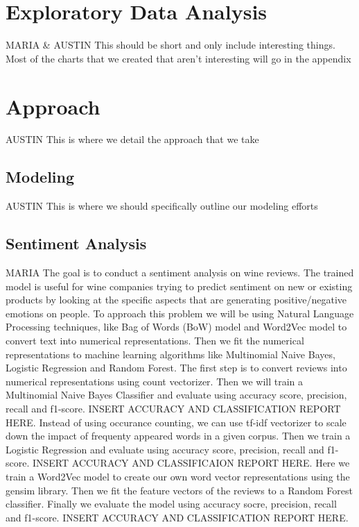 \documentclass[11pt,english]{article}
\begin{document}
\section{Exploratory Data Analysis}
    MARIA \& AUSTIN
    This should be short and only include interesting things. Most of the charts that we created that aren't interesting will go in the appendix

\section{Approach}
    AUSTIN
    This is where we detail the approach that we take

\subsection{Modeling}
    AUSTIN
    This is where we should specifically outline our modeling efforts

\subsection{Sentiment Analysis}
    MARIA
    The goal is to conduct a sentiment analysis on wine reviews. The trained model is useful for wine companies trying to predict sentiment on new or existing products by looking at the specific aspects that are generating positive/negative emotions on people.   
    To approach this problem we will be using Natural Language Processing techniques, like Bag of Words (BoW) model and Word2Vec model to convert text into numerical representations. Then we fit the numerical representations to machine learning algorithms like Multinomial Naive Bayes, Logistic Regression and Random Forest. 
    The first step is to convert reviews into numerical representations using count vectorizer. Then we will train a Multinomial Naive Bayes Classifier and evaluate using accuracy score, precision, recall and f1-score. 
    INSERT ACCURACY AND CLASSIFICATION REPORT HERE.
    Instead of using occurance counting, we can use tf-idf vectorizer to scale down the impact of frequenty appeared words in a given corpus. Then we train a Logistic Regression and evaluate using accuracy score, precision, recall and f1-score. 
    INSERT ACCURACY AND CLASSIFICAION REPORT HERE. 
    Here we train a Word2Vec model to create our own word vector representations using the gensim library. Then we fit the feature vectors of the reviews to a Random Forest classifier. Finally we evaluate the model using accuracy socre, precision, recall and f1-score. 
    INSERT ACCURACY AND CLASSIFICATION REPORT HERE. 
\end{document}
